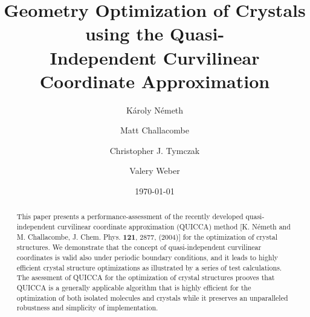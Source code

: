 \documentclass[prl,aps,preprint,superbib,12pt]{revtex4}
\begin{document}
\title{Geometry Optimization of Crystals using the Quasi-\\
       Independent Curvilinear Coordinate Approximation\footnotemark[1]}

\author{K\'aroly N\'emeth\footnotemark[1]}
\author{Matt Challacombe}
\author{Christopher J. Tymczak}
\author{Valery Weber}


\date{\today}

\begin{abstract}
This paper presents a performance-assessment 
of the recently developed quasi-independent curvilinear coordinate
approximation (QUICCA) method [K. N\'emeth and M. Challacombe,
J. Chem. Phys. {\bf 121}, 2877, (2004)] for the optimization of crystal 
structures. 
We demonstrate that the concept of quasi-independent
curvilinear coordinates is valid also under periodic boundary 
conditions,
and it leads to highly efficient crystal structure optimizations
as illustrated by a series of test calculations. 
The asessment of QUICCA for the optimization of crystal structures
prooves that QUICCA is a generally applicable algorithm
that is highly efficient for the optimization of both isolated 
molecules and crystals while it preserves an unparalleled robustness 
and simplicity of implementation.
\end{abstract}


\maketitle

\end{document}
